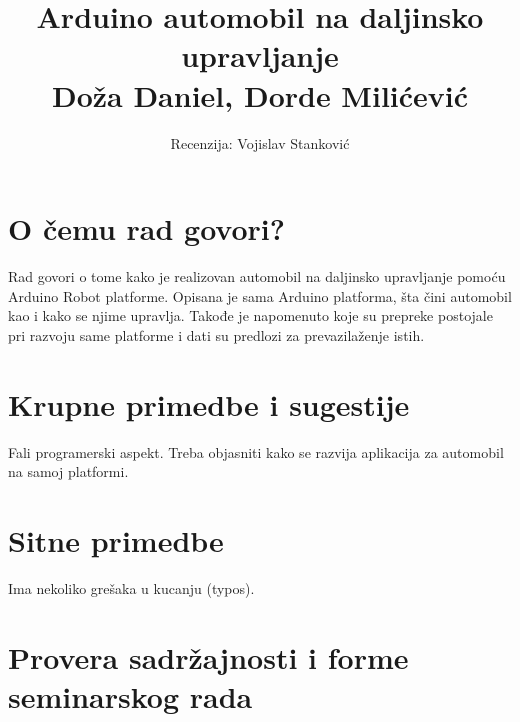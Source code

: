 \documentclass[a4paper]{article}
\begin{document}
	
	\title{Arduino automobil na daljinsko upravljanje\\ \small{Doža Daniel, Dorde Milićević}}
	
	\author{Recenzija: Vojislav Stanković}
	
	
	\maketitle
	
	
	
	
	\section{O čemu rad govori?}
	Rad govori o tome kako je realizovan automobil na daljinsko upravljanje pomoću Arduino Robot platforme.
	Opisana je sama Arduino platforma, šta čini automobil kao i kako se njime upravlja.
	Takođe je napomenuto koje su prepreke postojale pri razvoju same platforme i dati su predlozi za prevazilaženje istih.
	
	\section{Krupne primedbe i sugestije}
	Fali programerski aspekt. Treba objasniti kako se razvija aplikacija za automobil na samoj platformi.
	
	\section{Sitne primedbe}
	Ima nekoliko grešaka u kucanju (typos).
	
	\section{Provera sadržajnosti i forme seminarskog rada}
	
\end{document}
